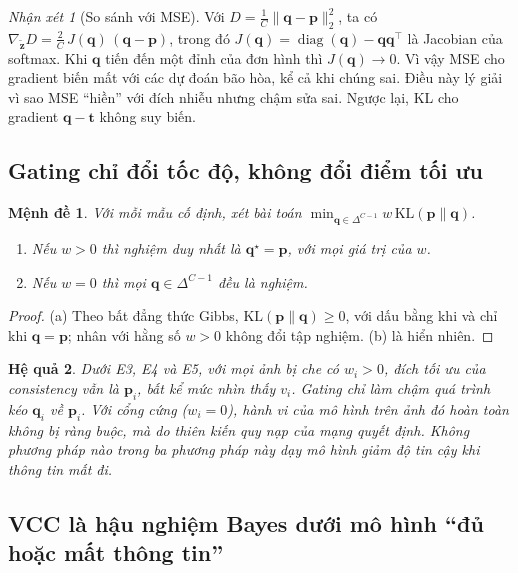 \documentclass[11pt,a4paper]{article}
\theoremstyle{plain}
\newtheorem{proposition}{Mệnh đề}
\newtheorem{corollary}[proposition]{Hệ quả}
\theoremstyle{definition}
\theoremstyle{remark}
\newtheorem{remark}{Nhận xét}
\newcommand{\Simplex}{\Delta^{C-1}}
\newcommand{\KL}{\mathrm{KL}}
\newcommand{\bp}{\bm{p}}
\newcommand{\bq}{\bm{q}}
\newcommand{\bt}{\bm{t}}
\newcommand{\bz}{\bm{z}}
\newcommand{\zt}{\tilde{\bz}}
\begin{document}
\begin{remark}[So sánh với MSE]
Với $D=\tfrac1C\|\bq-\bp\|_2^2$, ta có $\nabla_{\zt}D=\tfrac2C\,J(\bq)\,(\bq-\bp)$, trong đó $J(\bq)=\operatorname{diag}(\bq)-\bq\bq^\top$ là Jacobian của softmax. Khi $\bq$ tiến đến một đỉnh của đơn hình thì $J(\bq)\to0$. Vì vậy MSE cho gradient biến mất với các dự đoán bão hòa, kể cả khi chúng sai. Điều này lý giải vì sao MSE ``hiền'' với đích nhiễu \cite{laine2017temporal,tarvainen2017mean} nhưng chậm sửa sai. Ngược lại, KL cho gradient $\bq-\bt$ không suy biến.
\end{remark}

\subsection{Gating chỉ đổi tốc độ, không đổi điểm tối ưu}

\begin{proposition}
\label{prop:gating}
Với mỗi mẫu cố định, xét bài toán $\min_{\bq\in\Simplex} w\,\KL(\bp\|\bq)$.
\begin{enumerate}[label=(\alph*),itemsep=1pt]
  \item Nếu $w>0$ thì nghiệm duy nhất là $\bq^\star=\bp$, với mọi giá trị của $w$.
  \item Nếu $w=0$ thì mọi $\bq\in\Simplex$ đều là nghiệm.
\end{enumerate}
\end{proposition}
\begin{proof}
(a) Theo bất đẳng thức Gibbs, $\KL(\bp\|\bq)\ge0$, với dấu bằng khi và chỉ khi $\bq=\bp$; nhân với hằng số $w>0$ không đổi tập nghiệm. (b) là hiển nhiên.
\end{proof}

\begin{corollary}
Dưới E3, E4 và E5, với mọi ảnh bị che có $w_i>0$, đích tối ưu của consistency vẫn là $\bp_i$, \emph{bất kể} mức nhìn thấy $v_i$. Gating chỉ làm chậm quá trình kéo $\bq_i$ về $\bp_i$. Với cổng cứng ($w_i=0$), hành vi của mô hình trên ảnh đó hoàn toàn không bị ràng buộc, mà do thiên kiến quy nạp của mạng quyết định. Không phương pháp nào trong ba phương pháp này \emph{dạy} mô hình giảm độ tin cậy khi thông tin mất đi.
\end{corollary}

\subsection{VCC là hậu nghiệm Bayes dưới mô hình ``đủ hoặc mất thông tin''}
\end{document}
